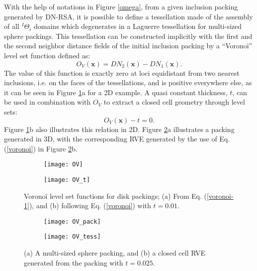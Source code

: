 With the help of notations in Figure \ref{omega}, from a given inclusion packing generated by DN-RSA, it is possible to define a tessellation made of the assembly of all $ ^I\Theta_i $ domains which degenerates in a Laguerre tessellation for multi-sized sphere packings. This tessellation can be constructed implicitly with the first and the second neighbor distance fields of the initial inclusion packing by a ``Vorono\"i'' level set function defined as:
\begin{equation}
O_V(\textbf{x})=DN_2(\textbf{x})-DN_1(\textbf{x})\label{voronoi-1}.
\end{equation}
The value of this function is exactly zero at loci equidistant from two nearest inclusions, i.e. on the faces of the tessellations, and is positive everywhere else, as it can be seen in Figure \ref{voronoi1}a for a 2D example. A quasi constant thickness, $ t $, can be used in combination with $ O_V $ to extract a closed cell geometry through level sets:
\begin{equation}
O_V(\textbf{x})-t=0\label{voronoi}.
\end{equation}
Figure \ref{voronoi1}b also illustrates this relation in 2D. Figure \ref{voronoi2}a illustrates a packing generated in 3D, with the corresponding RVE generated by the use of Eq. (\ref{voronoi}) in Figure \ref{voronoi2}b.

\begin{figure}
	\centering
	\begin{subfigure}[b]{0.32\textwidth}
		\texttt{[image: OV]}
		\caption{}
	\end{subfigure}
	\begin{subfigure}[b]{0.32\textwidth}
		\texttt{[image: OV\_t]}
		\caption{}
	\end{subfigure}
	\caption{Vorono\"i level set functions for disk packings; (a) From Eq. (\ref{voronoi-1}), and (b) following Eq. (\ref{voronoi}) with $ t=0.01 $.}\label{voronoi1}
\end{figure}

\begin{figure}
	\centering
	\begin{subfigure}[b]{0.32\textwidth}
		\texttt{[image: OV\_pack]}
		\caption{}
	\end{subfigure}
	\begin{subfigure}[b]{0.32\textwidth}
		\texttt{[image: OV\_tess]}
		\caption{}
	\end{subfigure}
	\caption{(a) A multi-sized sphere packing, and (b) a closed cell RVE generated from the packing with $ t=0.025 $.}\label{voronoi2}
\end{figure}

